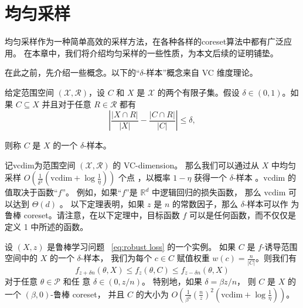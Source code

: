 \chapter{均匀采样}

均匀采样作为一种简单高效的采样方法，在各种各样的coreset算法中都有广泛应用。
在本章中，我们将介绍均匀采样的一些性质，为本文后续的证明铺垫。

在此之前，先介绍一些概念。以下的“$\delta$-样本”概念来自 VC 维度理论。

\begin{definition}
    给定范围空间 $(\mathcal{X}, \mathcal{R})$，设 $C$ 和 $X$ 是 $\mathcal{X}$ 的两个有限子集。假设 $\delta \in (0, 1)$。如果 $C \subseteq X$ 并且对于任意 $R \in \mathcal{R}$ 都有
    \begin{equation}
    \left| \frac{|X \cap R|}{|X|} - \frac{|C \cap R|}{|C|} \right| \leq \delta,
    \end{equation}

    则称 $C$ 是 $X$ 的一个 $\delta$-样本。
\end{definition}


记vcdim为范围空间 $(\mathcal{X}, \mathcal{R})$ 的 VC-dimension。
那么我们可以通过从 $X$ 中均匀采样 $O\left(\frac{1}{\delta^2} \left(\text{vcdim} + \log \frac{1}{\eta}\right)\right)$ 个点
，以概率 $1 - \eta$ 获得一个 $\delta$-样本 \citep{LLS01}。$\text{vcdim}$ 的值取决于函数“$f$”。
例如，如果“$f$”是 $\mathbb{R}^d$ 中逻辑回归的损失函数，
那么 $\text{vcdim}$ 可以达到 $\Theta(d)$ \citep{MSSW18}。
以下定理表明，如果 $z$ 是 $n$ 的常数因子，那么 $\delta$-样本可以作
为鲁棒 coreset。请注意，在以下定理中，目标函数 $f$ 可以是任何函数，而不仅仅是定义 1 中所述的函数。

\begin{theorem}
    设 $(X, z)$ 是鲁棒学习问题 ~\eqref{eq:robust loss} 的一个实例。
    如果 $C$ 是 $f$-诱导范围空间中的 $X$ 的一个 $\delta$-样本，
    我们为每个 $c \in C$ 赋值权重 $w(c) = \frac{n}{|C|}$。则我们有
    \begin{equation*}
    f_{z+\delta n}(\theta, X) \leq f_z(\theta, C) \leq f_{z-\delta n}(\theta, X)
    \end{equation*}
    对于任意 $\theta \in \mathcal{P}$ 和任
    意 $\delta \in (0, z/n)$。
    特别地，如果 $\delta = \beta z / n$，
    则 $C$ 是 $X$ 的一个 $(\beta, 0)$-鲁棒 coreset，
    并且 $C$ 的大小为 $O\left(\frac{1}{\beta^2}\left(\frac{n}{z}\right)^2\left(\text{vcdim} + \log \frac{1}{\eta}\right)\right)$。
\end{theorem}

